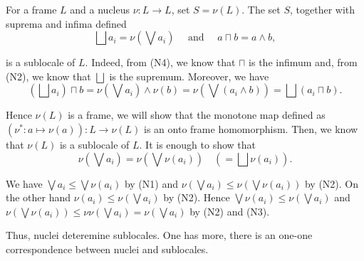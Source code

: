 For a frame $L$ and a nucleus $\nu\colon L \to L$, set $S = \nu(L)$. The set $S$, together with suprema and infima defined
    $$ \bigsqcup a_i = \nu(\bigvee a_i)\quad\text{ and }\quad a \sqcap b = a \wedge b, $$

\noindent is a sublocale of $L$. Indeed, from (N4), we know that $\sqcap$ is the infimum and, from (N2), we know that $\bigsqcup$ is the supremum. Moreover, we have
$$ (\bigsqcup a_i)\sqcap b = \nu(\bigvee a_i) \wedge \nu(b) = \nu(\bigvee(a_i \wedge b)) = \bigsqcup (a_i \sqcap b).$$

\noindent Hence $\nu(L)$ is a frame, we will show that the monotone map defined as $(\nu^*\colon a \mapsto \nu(a))\colon L \to \nu(L)$ is an onto frame homomorphism. Then, we know that $\nu(L)$ is a sublocale of $L$. It is enough to show that
    $$\nu(\bigvee a_i) = \nu(\bigvee \nu(a_i)) \quad( = \bigsqcup \nu(a_i)).$$

    \noindent We have $\bigvee a_i \leq \bigvee \nu(a_i)$ by (N1) and $\nu(\bigvee a_i) \leq \nu(\bigvee \nu(a_i))$ by (N2). On the other hand $\nu(a_i) \leq \nu(\bigvee a_i)$ by (N2). Hence $\bigvee \nu(a_i) \leq \nu(\bigvee a_i)$ and $\nu(\bigvee \nu(a_i)) \leq \nu\nu(\bigvee a_i) = \nu(\bigvee a_i)$ by (N2) and (N3).

    Thus, nuclei deteremine sublocales. One has more, there is an one-one correspondence between nuclei and sublocales.

